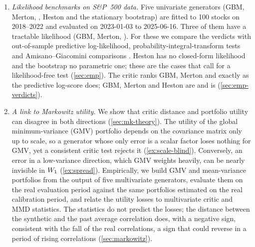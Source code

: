 \begin{enumerate}
  \item \emph{Likelihood benchmarks on S\&P~500 data.} Five univariate generators (GBM, Merton,
  \GARCHt{}, Heston and the stationary bootstrap) are fitted to 100 stocks on 2018--2022 and
  evaluated on 2023-01-03 to 2025-06-16. Three of them have a tractable likelihood (GBM, Merton,
  \GARCHt{}). For these we compare the verdicts with out-of-sample predictive log-likelihood,
  probability-integral-transform tests and Amisano--Giacomini comparisons
  \citep{diebold1998evaluating,berkowitz2001testing,amisano2007comparing}. Heston has no
  closed-form likelihood \citep{aitsahalia2007maximum} and the bootstrap no parametric one; these
  are the cases that call for a likelihood-free test (\cref{sec:emp}). The critic ranks GBM,
  Merton and \GARCHt{} exactly as the predictive log-score does; GBM, Merton and Heston are \BAD{}
  and \GARCHt{} is \INCONCL{} (\cref{sec:emp-verdicts}).

  \item \emph{A link to Markowitz utility.} We show that critic distance and portfolio utility can
  disagree in both directions (\cref{sec:mk-theory}). The utility of the global minimum-variance
  (GMV) portfolio depends on the covariance matrix only up to scale, so a generator whose only
  error is a scalar factor loses nothing for GMV, yet a consistent critic test rejects it
  (\cref{ex:scale-blind}). Conversely, an error in a low-variance direction, which GMV weights
  heavily, can be nearly invisible in $W_{1}$ (\cref{ex:spread}). Empirically, we build GMV and
  mean-variance portfolios from the output of five multivariate generators, evaluate them on the
  real evaluation period against the same portfolios estimated on the real calibration period,
  and relate the utility losses to multivariate critic and MMD statistics. The statistics do not
  predict the losses; the distance between the synthetic and the past average correlation does,
  with a negative sign, consistent with the fall of the real correlations, a sign that could
  reverse in a period of rising correlations (\cref{sec:markowitz}).
\end{enumerate}

